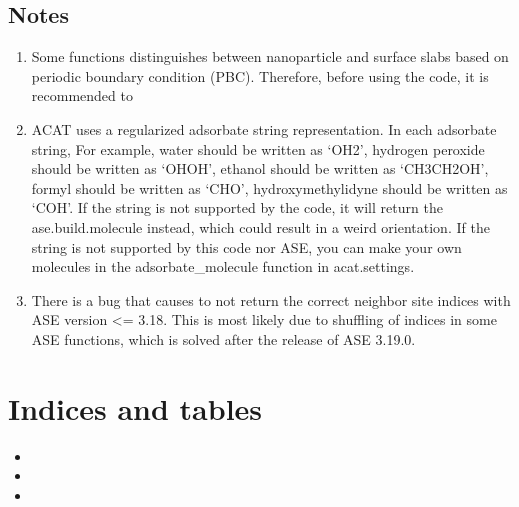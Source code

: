 \documentclass[letterpaper,10pt,english]{sphinxmanual}
\begin{document}
\section{Notes}
\label{\detokenize{notes:notes}}\label{\detokenize{notes::doc}}\begin{enumerate}
%
\item {} 
Some functions distinguishes between nanoparticle and surface slabs based on periodic boundary condition (PBC). Therefore, before using the code, it is recommended to 

\item {} 
ACAT uses a regularized adsorbate string representation. In each adsorbate string,  For example, water should be written as ‘OH2’, hydrogen peroxide should be written as ‘OHOH’, ethanol should be written as ‘CH3CH2OH’, formyl should be written as ‘CHO’, hydroxymethylidyne should be written as ‘COH’. If the string is not supported by the code, it will return the ase.build.molecule instead, which could result in a weird orientation. If the string is not supported by this code nor ASE, you can make your own molecules in the adsorbate\_molecule function in acat.settings.

\item {} 
There is a bug that causes  to not return the correct neighbor site indices with ASE version \textless{}= 3.18. This is most likely due to shuffling of indices in some ASE functions, which is solved after the release of ASE 3.19.0.

\end{enumerate}


\chapter{Indices and tables}
\label{\detokenize{index:indices-and-tables}}\begin{itemize}
\item {} 

\item {} 

\item {} 

\end{itemize}
\end{document}
